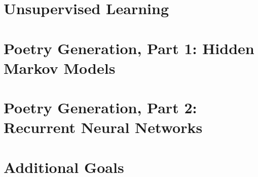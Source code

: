 \section{Unsupervised Learning}
\medskip



\section{Poetry Generation, Part 1: Hidden Markov Models}
\medskip


\section{Poetry Generation, Part 2: Recurrent Neural Networks}
\medskip



\section{Additional Goals}
\medskip


